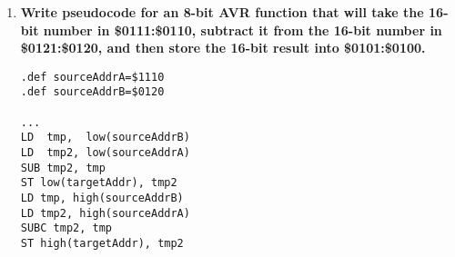 \documentclass[12pt,letterpaper]{article}
\begin{document}
\begin{enumerate}
  \item \textbf{Write pseudocode for an 8-bit AVR function that will take the 16-bit number in \$0111:\$0110, subtract it from the 16-bit number in \$0121:\$0120, and then store the 16-bit result into \$0101:\$0100.}
    \begin{verbatim}
.def sourceAddrA=$1110
.def sourceAddrB=$0120

...
LD  tmp,  low(sourceAddrB)
LD  tmp2, low(sourceAddrA)
SUB tmp2, tmp
ST low(targetAddr), tmp2
LD tmp, high(sourceAddrB)
LD tmp2, high(sourceAddrA)
SUBC tmp2, tmp
ST high(targetAddr), tmp2
    \end{verbatim}



  \end{enumerate}
\end{document}

